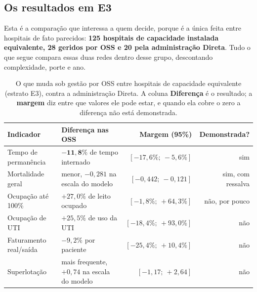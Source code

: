 \subsection{Os resultados em E3}

Esta é a comparação que interessa a quem decide, porque é a única feita
entre hospitais de fato parecidos: \textbf{125 hospitais de capacidade
instalada equivalente, 28 geridos por OSS e 20 pela administração Direta}.
Tudo o que segue compara essas duas redes dentro desse grupo, descontando
complexidade, porte e ano.

\begin{table}[H]
\centering
\caption{O que muda sob gestão por OSS entre hospitais de capacidade
equivalente (estrato E3), contra a administração Direta. A coluna
\textbf{Diferença} é o resultado; a \textbf{margem} diz entre que valores
ele pode estar, e quando ela cobre o zero a diferença não está
demonstrada.}
\label{tab:e3resultados}
\small
\begin{tabular}{llrr}
\toprule
Indicador & Diferença nas OSS & Margem (95\%) & Demonstrada? \\
\midrule
Tempo de permanência      & $\mathbf{-11{,}8\%}$ de tempo internado & $[-17{,}6\%;\ -5{,}6\%]$ & sim \\
Mortalidade geral         & menor, $-0{,}281$ na escala do modelo & $[-0{,}442;\ -0{,}121]$ & sim, com ressalva \\
Ocupação até 100\%        & $+27{,}0\%$ de leito ocupado & $[-1{,}8\%;\ +64{,}3\%]$ & não, por pouco \\
Ocupação de UTI           & $+25{,}5\%$ de uso da UTI & $[-18{,}4\%;\ +93{,}0\%]$ & não \\
Faturamento real/saída    & $-9{,}2\%$ por paciente & $[-25{,}4\%;\ +10{,}4\%]$ & não \\
Superlotação              & mais frequente, $+0{,}74$ na escala do modelo & $[-1{,}17;\ +2{,}64]$ & não \\
\bottomrule
\end{tabular}
\end{table}



